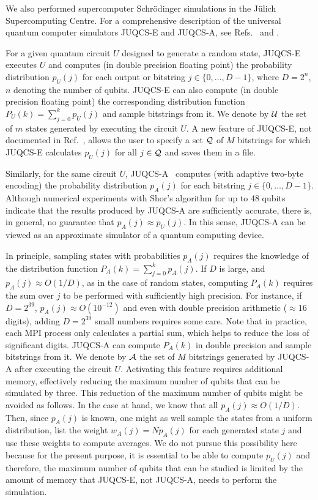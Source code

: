 We also performed supercomputer Schr\"odinger simulations in the  J\"ulich Supercomputing Centre.
For a comprehensive description of the universal quantum computer simulators
JUQCS-E and JUQCS-A, see Refs.~\cite{RAED07x} and \cite{RAED19a}.

For a given quantum circuit $U$ designed to generate a random state,
JUQCS-E~\cite{RAED19a} executes $U$ and computes (in double precision floating point) the probability distribution $p_U(j)$
for each output or bitstring $j\in\{0,\ldots,D-1\}$, where $D=2^n$, $n$ denoting the number of qubits.
JUQCS-E can also compute (in double precision floating point) the corresponding distribution function
$P_U(k)=\sum_{j=0}^k p_U(j)$ and sample bitstrings from it.
We denote by ${\cal U}$ the set of $m$ states generated by executing the circuit $U$.
A new feature of JUQCS-E, not documented in Ref.~,
allows the user to specify a set ${\cal Q}$ of $M$ bitstrings
for which JUQCS-E calculates $p_U(j)$ for all $j\in{\cal Q}$ and saves them in a file.

Similarly, for the same circuit $U$, JUQCS-A~\cite{RAED19a} computes (with adaptive two-byte encoding)
the probability distribution $p_A(j)$ for each bitstring $j\in\{0,\ldots,D-1\}$.
Although numerical experiments  with Shor's algorithm for up to 48 qubits indicate that
the results produced by JUQCS-A are sufficiently accurate,
there is, in general, no guarantee that $p_A(j)\approx p_U(j)$.
In this sense, JUQCS-A can be viewed as an approximate simulator of a quantum computing device.

In principle, sampling states with probabilities $p_A(j)$ requires the knowledge of the
distribution function $P_A(k)=\sum_{j=0}^k p_A(j)$.
If $D$ is large, and $p_A(j)\approx {O}(1/D)$, as in the case of random states, computing
$P_A(k)$ requires the sum over $j$ to be performed with sufficiently high precision.
For instance, if $D=2^{39}$, $p_A(j)\approx{O}(10^{-12})$ and
even with double precision arithmetic ($\approx 16$ digits), adding
$D=2^{39}$ small numbers requires some care. Note that in practice, each MPI process
only calculates a partial sum, which helps to reduce the loss of significant digits.
JUQCS-A can compute $P_A(k)$ in double precision and sample bitstrings from it.
We denote by ${\cal A}$ the set of $M$ bitstrings generated by JUQCS-A after executing the circuit $U$.
Activating this feature requires additional memory, effectively reducing the maximum number of qubits that
can be simulated by three.
This reduction of the maximum number of qubits might be avoided as follows.
In the case at hand, we know that all $p_A(j)\approx {O}(1/D)$.
Then, since $p_A(j)$ is known, one might as well sample the states from a uniform distribution,
list the weight $w_A(j)=N p_A(j)$ for each generated state $j$
and use these weights to compute averages.
We do not pursue this possibility here because for the present purpose,
it is essential to be able to compute $p_U(j)$ and therefore,
the maximum number of qubits that can be studied is limited
by the amount of memory that JUQCS-E, not JUQCS-A, needs to perform the simulation.

